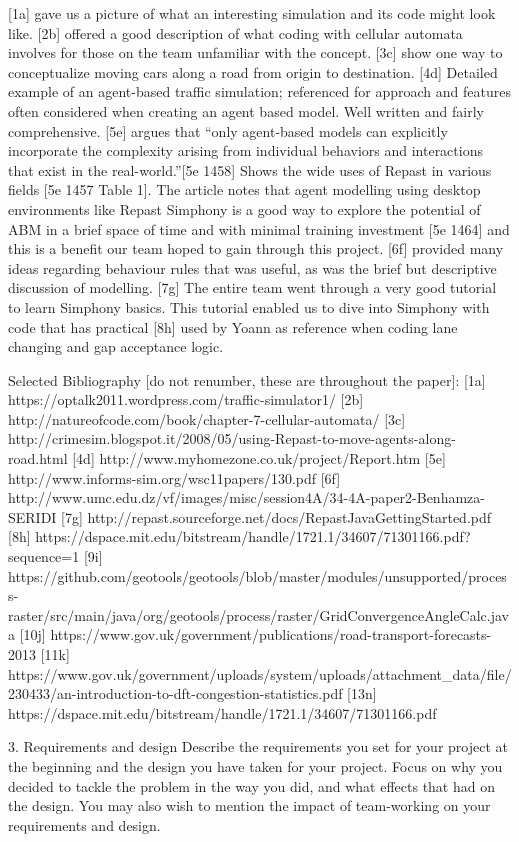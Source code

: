 \documentclass[11pt]{article}
\begin{document}
[1a] gave us a picture of what an interesting simulation and its code might look like. [2b] offered a good description of what coding with cellular automata involves for those on the team unfamiliar with the concept.
[3c] show one way to conceptualize moving cars along a road from origin to destination. 
[4d] Detailed example of an agent-based traffic simulation; referenced for approach and features often considered when creating an agent based model. Well written and fairly comprehensive.
[5e] argues that “only agent-based models can explicitly incorporate the complexity arising from individual behaviors and interactions that exist in the real-world.”[5e 1458] Shows the wide uses of Repast in various fields [5e 1457 Table 1]. The article notes that agent modelling using desktop environments like Repast Simphony is a good way to explore the potential of ABM in a brief space of time and with minimal training investment [5e 1464] and this is a benefit our team hoped to gain through this project.
[6f] provided many ideas regarding behaviour rules that was useful, as was the brief but descriptive discussion of modelling.
[7g] The entire team went through a very good tutorial to learn Simphony basics. This tutorial enabled us to dive into Simphony with code that has practical 
[8h] used by Yoann as reference when coding lane changing and gap acceptance logic.

Selected Bibliography [do not renumber, these are throughout the paper]:
[1a]  https://optalk2011.wordpress.com/traffic-simulator1/
[2b]  http://natureofcode.com/book/chapter-7-cellular-automata/
[3c] http://crimesim.blogspot.it/2008/05/using-Repast-to-move-agents-along-road.html
[4d] http://www.myhomezone.co.uk/project/Report.htm
[5e] http://www.informs-sim.org/wsc11papers/130.pdf
[6f] http://www.umc.edu.dz/vf/images/misc/session4A/34-4A-paper2-Benhamza-SERIDI%
[7g] http://repast.sourceforge.net/docs/RepastJavaGettingStarted.pdf
[8h] https://dspace.mit.edu/bitstream/handle/1721.1/34607/71301166.pdf?sequence=1
[9i] https://github.com/geotools/geotools/blob/master/modules/unsupported/process-raster/src/main/java/org/geotools/process/raster/GridConvergenceAngleCalc.java
[10j] https://www.gov.uk/government/publications/road-transport-forecasts-2013
[11k] https://www.gov.uk/government/uploads/system/uploads/attachment_data/file/230433/an-introduction-to-dft-congestion-statistics.pdf
 [13n] https://dspace.mit.edu/bitstream/handle/1721.1/34607/71301166.pdf




3. Requirements and design Describe the requirements you set for your project at the beginning and the design you have taken for your project. Focus on why you decided to tackle the problem in the way you did, and what effects that had on the design. You may also wish to mention the impact of team-working on your requirements and design.
\end{document}

